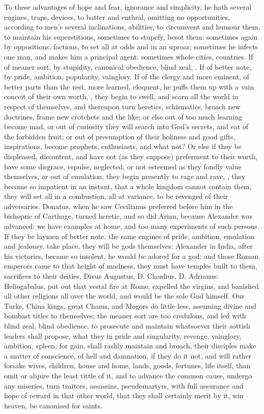 {To these advantages of hope and fear, ignorance and simplicity, he hath
several engines, traps, devices, to batter and enthral, omitting no
opportunities, according to men's several inclinations, abilities, to
circumvent and humour them, to maintain his superstitions, sometimes to
stupefy, besot them: sometimes again by oppositions, factions, to set
all at odds and in an uproar; sometimes he infects one man, and makes
him a principal agent; sometimes whole cities, countries. If of meaner
sort, by stupidity, canonical obedience, blind zeal, \etc{}. If of better
note, by pride, ambition, popularity, vainglory. If of the clergy and
more eminent, of better parts than the rest, more learned, eloquent, he
puffs them up with a vain conceit of their own worth, ,
they begin to swell, and scorn all the world in respect of themselves,
and thereupon turn heretics, schismatics, broach new doctrines, frame
new crotchets and the like; or else out of too much learning become
mad, or out of curiosity they will search into God's secrets, and eat
of the forbidden fruit; or out of presumption of their holiness and
good gifts, inspirations, become prophets, enthusiasts, and what not?
Or else if they be displeased, discontent, and have not (as they
suppose) preferment to their worth, have some disgrace, repulse,
neglected, or not esteemed as they fondly value themselves, or out of
emulation, they begin presently to rage and rave, , they become so impatient in an instant, that a whole kingdom
cannot contain them, they will set all in a combustion, all at
variance, to be revenged of their adversaries. Donatus, when he
saw Cecilianus preferred before him in the bishopric of Carthage,
turned heretic, and so did Arian, because Alexander was advanced: we
have examples at home, and too many experiments of such persons. If
they be laymen of better note, the same engines of pride, ambition,
emulation and jealousy, take place, they will be gods themselves:
Alexander in India, after his victories, became so insolent, he
would be adored for a god: and those Roman emperors came to that height
of madness, they must have temples built to them, sacrifices to their
deities, Divus Augustus, D. Claudius, D. Adrianus: Heliogabalus,
put out that vestal fire at Rome, expelled the virgins, and banished
all other religions all over the world, and would be the sole God
himself. Our Turks, China kings, great Chams, and Mogors do little
less, assuming divine and bombast titles to themselves; the meaner sort
are too credulous, and led with blind zeal, blind obedience, to
prosecute and maintain whatsoever their sottish leaders shall propose,
what they in pride and singularity, revenge, vainglory, ambition,
spleen, for gain, shall rashly maintain and broach, their disciples
make a matter of conscience, of hell and damnation, if they do it not,
and will rather forsake wives, children, house and home, lands, goods,
fortunes, life itself, than omit or abjure the least tittle of it, and
to advance the common cause, undergo any miseries, turn traitors,
assassins, pseudomartyrs, with full assurance and hope of reward in
that other world, that they shall certainly merit by it, win heaven, be
canonised for saints.

}

